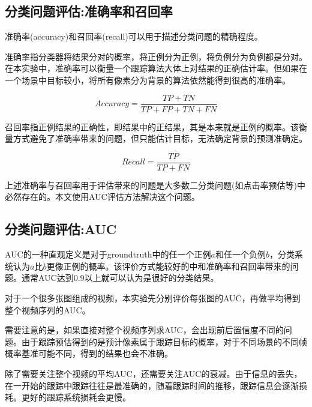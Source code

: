 \subsection{分类问题评估:准确率和召回率}
准确率(accuracy)和召回率(recall)可以用于描述分类问题的精确程度。
\par
准确率指分类器将结果分对的概率，将正例分为正例，将负例分为负例都是分对。在本实验中，准确率可以衡量一个跟踪算法大体上对结果的正确估计率。但如果在一个场景中目标较小，将所有像素分为背景的算法依然能得到很高的准确率。
\par
\begin{equation}\label{equ:accuracy}  Accuracy=\frac{TP+TN}{TP+FP+TN+FN}  \end{equation}
\par
召回率指正例结果的正确性，即结果中的正结果，其是本来就是正例的概率。该衡量方式避免了准确率带来的问题，但只能估计目标，无法确定背景的预测准确定。
\par
\begin{equation}\label{equ:recall}  Recall=\frac{TP}{TP+FN}  \end{equation}
\par
上述准确率与召回率用于评估带来的问题是大多数二分类问题(如点击率预估等)中必然存在的。本文使用AUC评估方法解决这个问题。

\subsection{分类问题评估:AUC} \label{section:auc}
AUC的一种直观定义是对于groundtruth中的任一个正例$a$和任一个负例$b$，分类系统认为$a$比$b$更像正例的概率。该评价方式能较好的中和准确率和召回率带来的问题。通常AUC达到0.9以上就可以认为是很好的分类结果。
\par
对于一个很多张图组成的视频，本实验先分别评价每张图的AUC，再做平均得到整个视频序列的AUC。
\par
需要注意的是，如果直接对整个视频序列求AUC，会出现前后置信度不同的问题。由于跟踪预估得到的是预计像素属于跟踪目标的概率，对于不同场景的不同帧概率基准可能不同，得到的结果也会不准确。
\par
除了需要关注整个视频的平均AUC，还需要关注AUC的衰减。由于信息的丢失，在一开始的跟踪中跟踪往往是最准确的，随着跟踪时间的推移，跟踪信息会逐渐损耗。更好的跟踪系统损耗会更慢。


